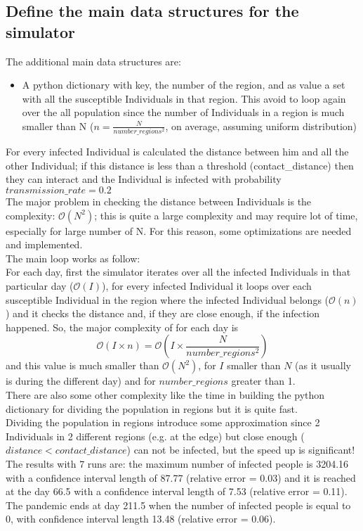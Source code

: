 \documentclass[twocolumn,letterpaper]{report}
\begin{document}
{					\subsection{Define the main data structures for the simulator}
						The additional main data structures are: 
							\begin{itemize}
								\item A python dictionary with key, the number of the region, and as value a set with all the susceptible Individuals in that region. This avoid to loop again over the all population since the number of Individuals in a region is much smaller than N ($n=\frac{N}{number\_regions^2}$, on average, assuming uniform distribution)
							\end{itemize}
							For every infected Individual is calculated the distance between him and all the other Individual; if this distance is less than a threshold (contact\_distance) then they can interact and the Individual is infected with probability $transmission\_rate=0.2$\\
							The major problem in checking the distance between Individuals is the complexity: $\mathcal{O}(N^2)$; this is quite a large complexity and may require lot of time, especially for large number of N. For this reason, some optimizations are needed and implemented. \\
	The main loop works as follow: \\
	For each day, first the simulator iterates over all the infected Individuals in that particular day ($\mathcal{O}(I)$), for every infected Individual it loops over each susceptible Individual in the region where the infected Individual belongs ($\mathcal{O}(n)$) and it checks the distance and, if they are close enough, if the infection happened. So, the major complexity of for each day is 
	\[ \mathcal{O}(I \times n)=\mathcal{O}(I \times \frac{N}{number\_regions^2}) \] and this value is much smaller than $\mathcal{O}(N^2)$, for $I$ smaller than $N$ (as it usually is during the different day) and for $number\_regions$ greater than 1. \\
	 There are also some other complexity like the time in building the python dictionary for dividing the population in regions but it is quite fast.\\
	Dividing the population in regions introduce some approximation since 2 Individuals in 2 different regions (e.g. at the edge) but close enough ($distance<contact\_distance$) can not be infected, but the speed up is significant! \\
	\noindent
				The results with 7 runs are: the maximum number of infected people is 3204.16 with a confidence interval length of 87.77 (relative error = 0.03) and it is reached at the day 66.5 with a confidence interval length of 7.53 (relative error = 0.11). The pandemic ends at day 211.5 when the number of infected people is equal to 0, with confidence interval length 13.48 (relative error = 0.06).
				
}
\end{document}
